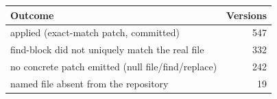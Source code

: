 \begin{tabular}{lr}
\toprule
Outcome & Versions \\
\midrule
applied (exact-match patch, committed) & 547 \\
find-block did not uniquely match the real file & 332 \\
no concrete patch emitted (null file/find/replace) & 242 \\
named file absent from the repository & 19 \\
\bottomrule
\end{tabular}
